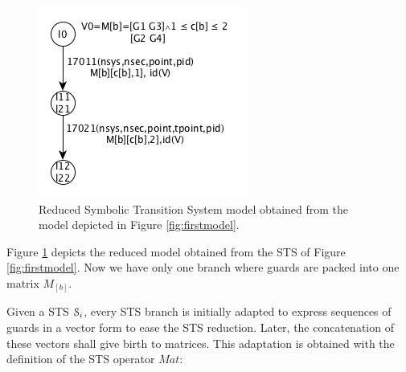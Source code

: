 \begin{figure}[h]
    \begin{center}
        \includegraphics[width=0.5\linewidth]{figures/STS2.png}
    \end{center}

	\caption{Reduced Symbolic Transition System model obtained
    from the model depicted in Figure \ref{fig:firstmodel}.}
	\label{fig:reduced-model}
\end{figure}

Figure \ref{fig:reduced-model} depicts the reduced model obtained
from the STS of Figure \ref{fig:firstmodel}. Now we have only one
branch where guards are packed into one matrix $M_{[b]}$.

Given a STS $\EuScript{S}_i$, every STS branch is initially
adapted to express sequences of guards in a vector form to ease
the STS reduction. Later, the concatenation of these vectors
shall give birth to matrices. This adaptation is obtained with
the definition of the STS operator $Mat$:

